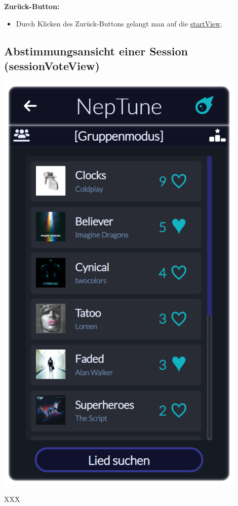 \documentclass[oneside, ngerman]{sdqtechreport}
\begin{document}
\textbf{Zurück-Button:}
\begin{itemize}
    \item Durch Klicken des Zurück-Buttons gelangt man auf die \hyperlink{startView}{startView}.
\end{itemize}

\subsection{Abstimmungsansicht einer Session (sessionVoteView)}
\label{sec:Benutzeroberfläche:joinSessionView}


\begin{minipage}{0.5\textwidth}
    \hypertarget{sessionVoteView}{}
    \includegraphics[width=0.9\textwidth]{LATEX/Pflichtenheft/GraphicDesigns/userVotePage.png}
\end{minipage} 
\hfill
\begin{minipage}{0.5\textwidth}
    XXX
\end{minipage}
\end{document}
